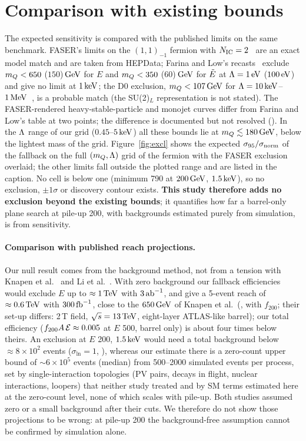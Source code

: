 \section{Comparison with existing bounds}\label{sec:bounds}

The expected sensitivity is compared with the published limits on the same benchmark. FASER's limits on the
$(1,1)_{-1}$ fermion with $N_{\rm IC}=2$~\cite{FASER:2026fsy,FASER:HEPData181308v1t2} are an exact model match and are
taken from HEPData; Farina and Low's recasts~\cite[Table~II]{Farina:2017cts} exclude $m_Q<650$ ($150$)$\,\mathrm{GeV}$ for $E$ and
$m_Q<350$ ($60$)$\,\mathrm{GeV}$ for $\tilde{E}$ at $\Lambda=1\,\mathrm{eV}$ ($100\,\mathrm{eV}$) and give no limit at $1\,\mathrm{keV}$; the D0 exclusion, $m_Q<107\,\mathrm{GeV}$ for
$\Lambda=10\,\mathrm{keV}$--$1\,\mathrm{MeV}$~\cite{D0:2010kkd}, is a probable match (the SU(2)$_L$ representation is not stated). The
FASER-rendered heavy-stable-particle and monojet curves differ from Farina and Low's table at two points; the difference is
documented but not resolved ().
In the $\Lambda$ range of our grid ($0.45$--$5\,\mathrm{keV}$) all these bounds lie at $m_Q\lesssim180\,\mathrm{GeV}$, below the lightest
mass of the grid. Figure~\ref{fig:excl} shows the expected
$\sigma_{95}/\sigma_{\rm norm}$ of the fallback on the full $(m_Q,\Lambda)$ grid of the fermion with the FASER exclusion
overlaid; the other limits fall outside the plotted range and are listed in the caption. No cell is below one (minimum 790 at $200\,\mathrm{GeV}$,
$1.5\,\mathrm{keV}$), so no exclusion, $\pm1\sigma$ or discovery contour exists. \textbf{This study therefore adds no exclusion beyond
the existing bounds}; it quantifies how far a barrel-only plane search at pile-up 200, with backgrounds estimated purely from
simulation, is from sensitivity.

\paragraph{Comparison with published reach projections.} Our null result comes from the background method, not from a
tension with Knapen et al.~\cite{Knapen:2017kly} and Li et al.~\cite{Li:2019wce}. With zero background our fallback
efficiencies would exclude $E$ up to $\approx1\,\mathrm{TeV}$ with $3\,\mathrm{ab}^{-1}$, and give a 5-event reach of $\approx0.6\,\mathrm{TeV}$ with
$300\,\mathrm{fb}^{-1}$, close to the $650\,\mathrm{GeV}$ of Knapen et al.\ (\EST{}, with $f_{200}$; their set-up differs: 2\,T field,
$\sqrt s=13\,\mathrm{TeV}$, eight-layer ATLAS-like barrel); our total efficiency
($f_{200}A\,\mathcal{E}\approx0.005$ at $E$ 500, barrel only) is about four times below theirs. An exclusion at $E$ 200,
$1.5\,\mathrm{keV}$ would need a total background below $\approx8\times10^2$ events ($\sigma_{\ln}=1$, \EST{}), whereas our estimate
there is a zero-count upper bound of $\sim6\times10^5$ events (median) from 500--2000 simulated events per process, set
by single-interaction topologies (PV pairs, decays in flight, nuclear interactions, loopers) that neither study treated
and by SM terms estimated here at the zero-count level, none of which scales with pile-up. Both studies assumed zero or a
small background after their cuts. We therefore do not
show those projections to be wrong: at pile-up 200 the background-free assumption cannot be confirmed by simulation alone.

